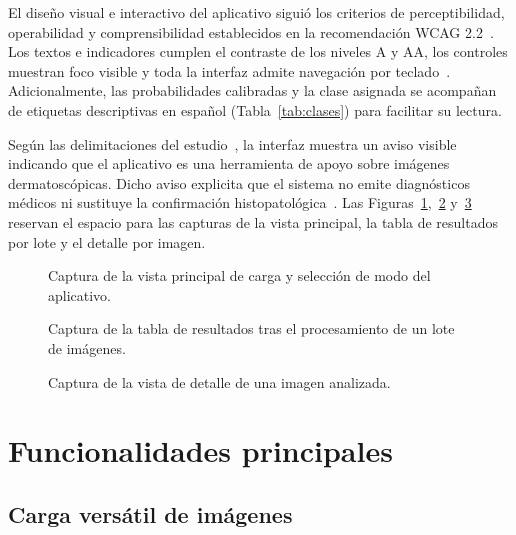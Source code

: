El diseño visual e interactivo del aplicativo siguió los criterios de perceptibilidad, operabilidad y comprensibilidad establecidos en la recomendación WCAG 2.2~\cite{w3c2023wcag22}. Los textos e indicadores cumplen el contraste de los niveles A y AA, los controles muestran foco visible y toda la interfaz admite navegación por teclado~\cite{w3c2023wcag22}. Adicionalmente, las probabilidades calibradas y la clase asignada se acompañan de etiquetas descriptivas en español (Tabla~\ref{tab:clases}) para facilitar su lectura.

Según las delimitaciones del estudio~\cite{amaral2025esmo}, la interfaz muestra un aviso visible indicando que el aplicativo es una herramienta de apoyo sobre imágenes dermatoscópicas. Dicho aviso explicita que el sistema no emite diagnósticos médicos ni sustituye la confirmación histopatológica~\cite{amaral2025esmo}. Las Figuras~\ref{fig:vista-principal},~\ref{fig:resultados-lote} y~\ref{fig:detalle-imagen} reservan el espacio para las capturas de la vista principal, la tabla de resultados por lote y el detalle por imagen.

\begin{figure}[H]
  \centering
  \caption{Captura de la vista principal de carga y selección de modo del aplicativo.}
  \label{fig:vista-principal}
\end{figure}

\begin{figure}[H]
  \centering
  \caption{Captura de la tabla de resultados tras el procesamiento de un lote de imágenes.}
  \label{fig:resultados-lote}
\end{figure}

\begin{figure}[H]
  \centering
  \caption{Captura de la vista de detalle de una imagen analizada.}
  \label{fig:detalle-imagen}
\end{figure}

\section{Funcionalidades principales}

\subsection{Carga versátil de imágenes}

